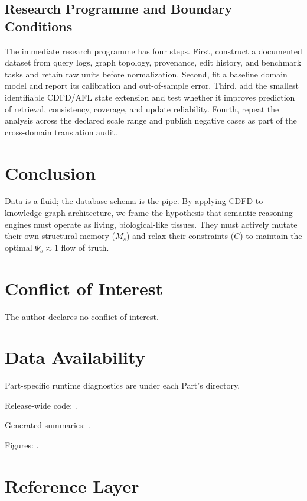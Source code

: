 \documentclass[11pt,a4paper]{article}
\begin{document}
\subsection{Research Programme and Boundary Conditions}

The immediate research programme has four steps. First, construct a documented
dataset from query logs, graph topology, provenance, edit history, and benchmark tasks and retain raw units before normalization.
Second, fit a baseline domain model and report its calibration and out-of-sample
error. Third, add the smallest identifiable CDFD/AFL state extension and test
whether it improves prediction of retrieval, consistency, coverage, and update reliability. Fourth, repeat the
analysis across the declared scale range and publish negative cases as part of
the cross-domain translation audit.


\section{Conclusion}
Data is a fluid; the database schema is the pipe. By applying CDFD to knowledge graph architecture, we frame the hypothesis that semantic reasoning engines must operate as living, biological-like tissues. They must actively mutate their own structural memory ($M_s$) and relax their constraints ($C$) to maintain the optimal $\Psi_s \approx 1$ flow of truth.
\section*{Conflict of Interest} The author declares no conflict of interest.
\section*{Data Availability}
Part-specific runtime diagnostics are under each Part's  directory.

Release-wide code: .

Generated summaries: .

Figures: .


\section{Reference Layer}


\end{document}
